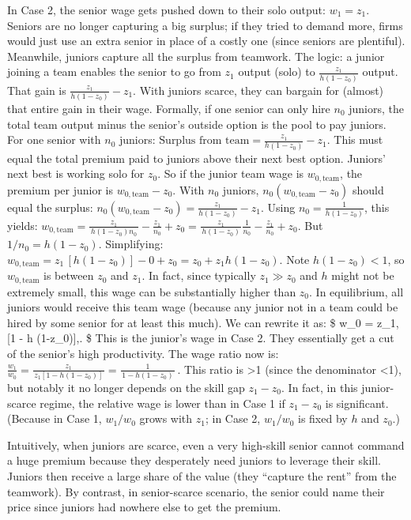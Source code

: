 \documentclass[12pt]{article}
\begin{document}
\begin{itemize}
  In Case 2, the {senior wage gets pushed down to their solo
  output}: \(w_1 = z_1.\) Seniors are no longer capturing a big surplus;
  if they tried to demand more, firms would just use an extra senior in
  place of a costly one (since seniors are plentiful). Meanwhile,
  {juniors capture all the surplus from teamwork}. The logic: a
  junior joining a team enables the senior to go from \(z_1\) output
  (solo) to \(\frac{z_1}{h(1-z_0)}\) output. That gain is
  \(\frac{z_1}{h(1-z_0)} - z_1\). With juniors scarce, they can bargain
  for (almost) that entire gain in their wage. Formally, if one senior
  can only hire \(n_0\) juniors, the total team output minus the
  senior's outside option is the pool to pay juniors. For one senior
  with \(n_0\) juniors:
  \(\text{Surplus from team} = \frac{z_1}{h(1-z_0)} - z_1.\) This must
  equal the total premium paid to juniors above their next best option.
  Juniors' next best is working solo for \(z_0\). So if the junior team
  wage is \(w_{0,\text{team}}\), the premium per junior is
  \(w_{0,\text{team}} - z_0\). With \(n_0\) juniors,
  \(n_0 (w_{0,\text{team}} - z_0)\) should equal the surplus:
  \(n_0 (w_{0,\text{team}} - z_0) = \frac{z_1}{h(1-z_0)} - z_1.\) Using
  \(n_0 = \frac{1}{h(1-z_0)}\), this yields:
  \(w_{0,\text{team}} = \frac{z_1}{\,h(1-z_0) n_0\,} - \frac{z_1}{n_0} + z_0 = \frac{z_1}{\,h(1-z_0)\,} \frac{1}{n_0} - \frac{z_1}{n_0} + z_0.\)
  But \(1/n_0 = h(1-z_0)\). Simplifying:
  \(w_{0,\text{team}} = z_1\, [h(1-z_0)] - 0 + z_0 = z_0 + z_1 h(1-z_0).\)
  Note \(h(1-z_0) < 1\), so \(w_{0,\text{team}}\) is between \(z_0\) and
  \(z_1\). In fact, since typically \(z_1 \gg z_0\) and \(h\) might not
  be extremely small, this wage can be substantially higher than
  \(z_0\). In equilibrium, all juniors would receive this team wage
  (because any junior not in a team could be hired by some senior for at
  least this much). We can rewrite it as: \$ w\_0 = z\_1,{[}1 - h
  (1-z\_0){]},. \$ This is the {junior's wage in Case 2}.
  They essentially get a cut of the senior's high productivity. The
  {wage ratio} now is:
  \(\frac{w_1}{w_0} = \frac{z_1}{\,z_1[1 - h(1-z_0)]\,} = \frac{1}{\,1 - h(1-z_0)\,}\,.\)
  This ratio is \textgreater1 (since the denominator \textless1), but
  notably it no longer depends on the skill gap \(z_1 - z_0\). In fact,
  in this junior-scarce regime, the {relative wage is lower} than
  in Case 1 if \(z_1 - z_0\) is significant. (Because in Case 1,
  \(w_1/w_0\) grows with \(z_1\); in Case 2, \(w_1/w_0\) is fixed by
  \(h\) and \(z_0\).)

  Intuitively, when juniors are scarce, even a very high-skill senior
  cannot command a huge premium because they desperately need juniors to
  leverage their skill. Juniors then receive a large share of the value
  (they ``capture the rent'' from the teamwork). By contrast, in
  senior-scarce scenario, the senior could name their price since
  juniors had nowhere else to get the premium.
\end{itemize}
\end{document}
